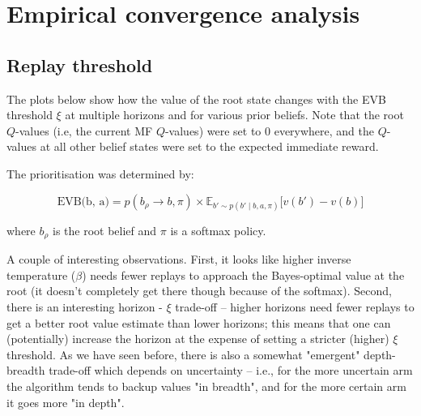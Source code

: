\documentclass{article}
\begin{document}
\section*{Empirical convergence analysis}

\subsection*{Replay threshold}
The plots below show how the value of the root state changes with the EVB threshold $\xi$ at multiple horizons 
and for various prior beliefs. Note that the root $Q$-values (i.e, the current MF $Q$-values) were set to $0$ 
everywhere, and the $Q$-values at all other belief states were set to the expected immediate reward.

\bigbreak

The prioritisation was determined by:

\begin{equation*}
    \text{EVB(b, a)} = p(b_{\rho}\rightarrow b, \pi) \times \mathbb{E}_{b' \sim p(b' \mid b, a, \pi)}\big[v(b')-v(b)\big]
\end{equation*}

where $b_{\rho}$ is the root belief and $\pi$ is a softmax policy.

\bigbreak

A couple of interesting observations. First, it looks like higher inverse temperature ($\beta$) needs 
fewer replays to approach the Bayes-optimal value at the root (it doesn't completely get there though 
because of the softmax). Second, there is an interesting horizon - $\xi$ trade-off -- higher horizons 
need fewer replays to get a better root value estimate than lower horizons; this means that one can 
(potentially) increase the horizon at the expense of setting a stricter (higher) $\xi$ threshold. As 
we have seen before, there is also a somewhat "emergent" depth-breadth trade-off which depends on 
uncertainty -- i.e., for the more uncertain arm the algorithm tends to backup values "in breadth", and 
for the more certain arm it goes more "in depth".  

\newpage
\end{document}
